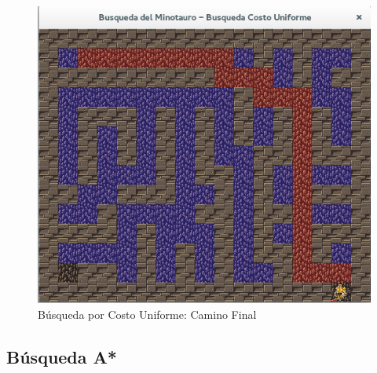 \documentclass[letter, titlepage, 10pt]{article}
\begin{document}
\begin{appendices}
  \begin{figure}[H]
    \begin{center}
        \includegraphics[scale = 0.4]{images/bcu_03}
        \caption{Búsqueda por Costo Uniforme: Camino Final}
    \end{center}
\end{figure}
  
  
  \subsection{Búsqueda A*}
    

\end{appendices}
\end{document}
